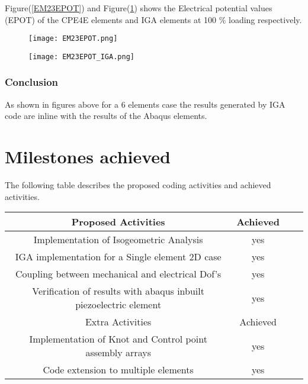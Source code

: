 \documentclass[11pt]{article}
\begin{document}
Figure(\ref{EM23EPOT}) and Figure(\ref{EM23EPOT_IGA}) shows the Electrical potential values (EPOT) of the CPE4E elements and IGA elements at 100 \% loading respectively. \\
\begin{figure}[H]
	\centering
	\begin{minipage}{.5\textwidth}
		\centering
		\texttt{[image: EM23EPOT.png]}
		\label{EM23EPOT}
	\end{minipage}%
	\begin{minipage}{.5\textwidth}
		\centering
		\texttt{[image: EM23EPOT\_IGA.png]}
		\label{EM23EPOT_IGA}
	\end{minipage}
\end{figure}

\subsubsection{Conclusion}
As shown in figures above for a 6 elements case the results generated by IGA code are inline with the results of the Abaqus elements.   




\section{Milestones achieved}
The following table describes the proposed coding activities and achieved activities.


\begin{center}
	\begin{tabular}{ |c|c|c|c| } 
		\hline
		Proposed Activities & Achieved \\
		\hline
		Implementation of Isogeometric Analysis & yes \\ 
		IGA implementation for a Single element 2D case& yes \\ 
		Coupling between mechanical and electrical Dof’s & yes \\ 
		Verification of results with abaqus inbuilt piezoelectric element & yes \\ 
		\hline
		Extra Activities & Achieved \\
		\hline
		Implementation of Knot and Control point assembly arrays & yes \\
		Code extension to multiple elements & yes \\
		\hline
	\end{tabular}
\end{center}
\end{document}
